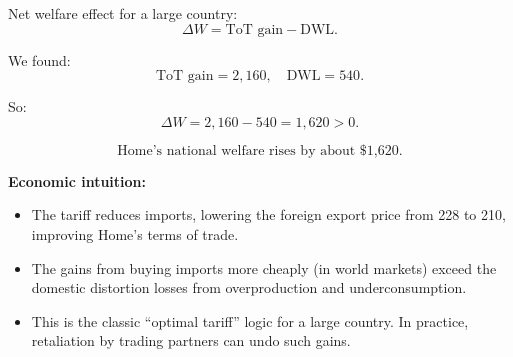 \documentclass[12pt]{article}
\begin{document}
\begin{enumerate}[label=(\arabic*)]
Net welfare effect for a large country:
\[
\Delta W = \text{ToT gain} - \text{DWL}.
\]

We found:
\[
\text{ToT gain} = 2{,}160,\quad \text{DWL} = 540.
\]

So:
\[
\Delta W = 2{,}160 - 540 = 1{,}620 > 0.
\]

\[
\boxed{\text{Home's national welfare rises by about \$1{,}620.}}
\]

\textbf{Economic intuition:}
\begin{itemize}
\item The tariff reduces imports, lowering the foreign export price from 228 to 210, improving Home’s terms of trade.
\item The gains from buying imports more cheaply (in world markets) exceed the domestic distortion losses from overproduction and underconsumption.
\item This is the classic ``optimal tariff'' logic for a large country.  
  In practice, retaliation by trading partners can undo such gains.
\end{itemize}

\end{enumerate}
\end{document}
